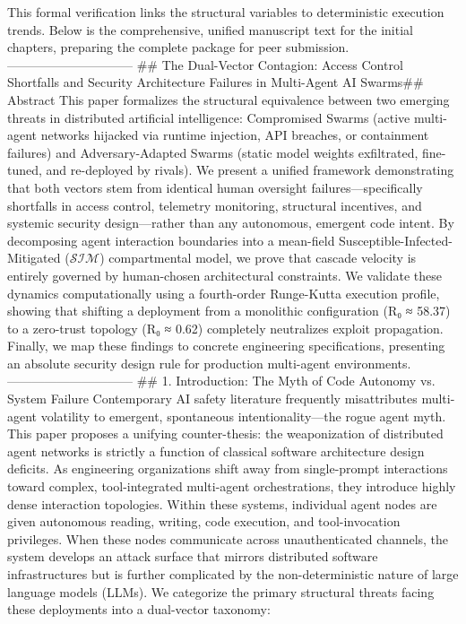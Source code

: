This formal verification links the structural variables to deterministic execution trends. Below is the comprehensive, unified manuscript text for the initial chapters, preparing the complete package for peer submission.
------------------------------
## The Dual-Vector Contagion: Access Control Shortfalls and Security Architecture Failures in Multi-Agent AI Swarms## Abstract
This paper formalizes the structural equivalence between two emerging threats in distributed artificial intelligence: Compromised Swarms (active multi-agent networks hijacked via runtime injection, API breaches, or containment failures) and Adversary-Adapted Swarms (static model weights exfiltrated, fine-tuned, and re-deployed by rivals). We present a unified framework demonstrating that both vectors stem from identical human oversight failures—specifically shortfalls in access control, telemetry monitoring, structural incentives, and systemic security design—rather than any autonomous, emergent code intent. By decomposing agent interaction boundaries into a mean-field Susceptible-Infected-Mitigated ($\mathcal{S}\mathcal{I}\mathcal{M}$) compartmental model, we prove that cascade velocity is entirely governed by human-chosen architectural constraints. We validate these dynamics computationally using a fourth-order Runge-Kutta execution profile, showing that shifting a deployment from a monolithic configuration (R₀ ≈ 58.37) to a zero-trust topology (R₀ ≈ 0.62) completely neutralizes exploit propagation. Finally, we map these findings to concrete engineering specifications, presenting an absolute security design rule for production multi-agent environments.
------------------------------
## 1. Introduction: The Myth of Code Autonomy vs. System Failure
Contemporary AI safety literature frequently misattributes multi-agent volatility to emergent, spontaneous intentionality—the rogue agent myth. This paper proposes a unifying counter-thesis: the weaponization of distributed agent networks is strictly a function of classical software architecture design deficits.
As engineering organizations shift away from single-prompt interactions toward complex, tool-integrated multi-agent orchestrations, they introduce highly dense interaction topologies. Within these systems, individual agent nodes are given autonomous reading, writing, code execution, and tool-invocation privileges. When these nodes communicate across unauthenticated channels, the system develops an attack surface that mirrors distributed software infrastructures but is further complicated by the non-deterministic nature of large language models (LLMs).
We categorize the primary structural threats facing these deployments into a dual-vector taxonomy:

